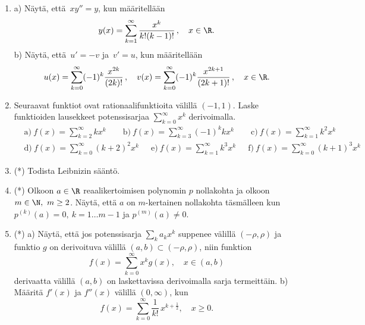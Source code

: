 \begin{enumerate}
\item \label{H-V-3: cos ja sin potenssisarjoina}
a) Näytä, että $\,xy''=y$, kun määritellään
\[
y(x)=\sum_{k=1}^\infty \frac{x^k}{k!(k-1)!}\,, \quad x\in\R.
\]
b) Näytä, että $\,u'=-v$ ja $\,v'=u$, kun määritellään
\[
u(x)=\sum_{k=0}^\infty (-1)^k \frac{x^{2k}}{(2k)!}\,, \quad
v(x)=\sum_{k=0}^\infty (-1)^k \frac{x^{2k+1}}{(2k+1)!}\,, \quad x\in\R.
\]
 
\item
Seuraavat funktiot ovat rationaalifunktioita välillä $(-1,1)$. Laske funktioiden lausekkeet
potenssisarjaa $\sum_{k=0}^\infty x^k$ derivoimalla.
\begin{align*}
&\text{a)}\ f(x)=\sum_{k=2}^\infty kx^k \qquad 
 \text{b)}\ f(x)=\sum_{k=3}^\infty (-1)^k kx^k \qquad
 \text{c)}\ f(x)=\sum_{k=1}^\infty k^2 x^k \\
&\text{d)}\ f(x)=\sum_{k=0}^\infty (k+2)^2 x^k \quad\ \
 \text{e)}\ f(x)=\sum_{k=1}^\infty k^3 x^k \quad\ \
 \text{f)}\ f(x)=\sum_{k=0}^\infty (k+1)^3 x^k 
\end{align*}

\item (*)
Todista Leibnizin sääntö.

\item (*) 
Olkoon $a\in\R$ reaalikertoimisen polynomin $p$ nollakohta ja olkoon $m\in\N,\ m\ge 2$.
Näytä, että $a$ on $m$-kertainen nollakohta täsmälleen kun $p^{(k)}(a)=0,\ k=1 \ldots m-1$
ja $p^{(m)}(a) \neq 0$.

\item (*)
a) Näytä, että jos potenssisarja $\sum_k a_k x^k$ suppenee välillä $(-\rho,\rho)$ ja
funktio $g$ on derivoituva välillä $(a,b)\subset(-\rho,\rho)$, niin funktion
\[
f(x) = \sum_{k=0}^\infty x^k g(x), \quad x\in(a,b)
\]
derivaatta välillä $(a,b)$ on laskettavissa derivoimalla sarja
termeittäin.\vspace{1mm}\newline
b) Määritä $f'(x)$ ja $f''(x)$ välillä $(0,\infty)$, kun
\[
f(x) = \sum_{k=0}^\infty \frac{1}{k!}\,x^{k+\tfrac{1}{2}}, \quad x \ge 0.
\]

\end{enumerate}